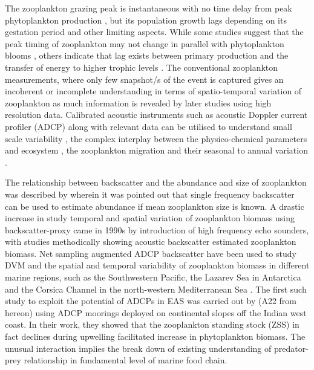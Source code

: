\documentclass{article}
\begin{document}
	The zooplankton grazing peak is instantaneous with no time delay from peak phytoplankton production \citep{li2000determines,barber2001qn}, but its population growth lags \citep{rehim2012dynamical, almen2020temperature} depending on its gestation period and other limiting aspects. While some studies suggest that the peak timing of zooplankton may not change in parallel with phytoplankton blooms \citep{winder2004climatic}, others indicate that lag exists between primary production and the transfer of energy to higher trophic levels \citep{brock1992interannual, brock1991phytoplankton}. The conventional zooplankton measurements, where only few snapshot/s of the event is captured gives an incoherent or incomplete understanding in terms of spatio-temporal variation of zooplankton \citep{ramamurthy1965studies, piontkovski1995spatial, madhupratap1992zooplankton,madhupratap1996lack,wishner1998mesozooplankton,kidwai2000dd,barber2001qn,khandagale2022seasonal} as much information is revealed by later studies \citep{jyothibabu2010re, vijith2016consequences, shankar2019role, aparna2022seasonal} using high resolution data. Calibrated acoustic instruments such as acoustic Doppler current profiler (ADCP) along with relevant data can be utilised to understand small scale variability \citep{nair1999arabian, edvardsen2003assessing, smith2005mesozooplankton, smeti2015spatial, kang2024acoustic}, the complex interplay between the physico-chemical parameters and ecosystem \citep{jiang2007temporal, potiris2018acoustic, shankar2019role, aparna2022seasonal, nie2023influence}, the zooplankton migration \citep{inoue2016diel,ursella2018evidence, ursella2021diel} and their seasonal to annual variation \citep{jiang2007temporal, hobbs2021marine,liu2022seasonal, aparna2022seasonal}.
	
    The relationship between backscatter and the abundance and size of zooplankton was described by \citet{greenlaw1979acoustical} wherein it was pointed out that single frequency backscatter can be used to estimate abundance if mean zooplankton size is known. A drastic increase in study temporal and spatial variation of zooplankton biomass using  backscatter-proxy came in 1990s by introduction of high frequency echo sounders, with studies \citep{flagg1989use, wiebe1990sound, batchelder00981, greene1998three, rippeth1998diur} methodically showing acoustic backscatter estimated zooplankton biomass.
	Net sampling augmented ADCP backscatter have been used to study DVM and the spatial and temporal variability of zooplankton biomass in different marine regions, such as the Southwestern Pacific, the Lazarev Sea in Antarctica and the Corsica Channel in the north-western Mediterranean Sea \citep{cisewski2010seasonal,hamilton2013links, smeti2015spatial, guerra2019zooplankton}. The first such study to exploit the potential of ADCPs in EAS was carried out by \citet{aparna2022seasonal} (A22 from hereon) using ADCP moorings deployed on continental slopes off the Indian west coast.	In their work, they showed that the zooplankton standing stock (ZSS) in fact declines during upwelling facilitated increase in phytoplankton biomass. The unusual interaction implies the break down of existing understanding of predator-prey relationship in fundamental level of marine food chain.
	
\end{document}

